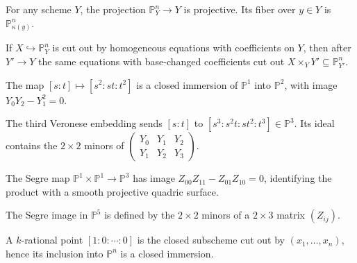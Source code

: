 \begin{example}\label{ex:vi38-08}
For any scheme \(Y\), the projection \(\mathbb P^n_Y\to Y\) is projective.  Its fiber over \(y\in Y\) is \(\mathbb P^n_{\kappa(y)}\).
\end{example}

\begin{example}\label{ex:vi38-09}
If \(X\hookrightarrow\mathbb P^n_Y\) is cut out by homogeneous equations with coefficients on \(Y\), then after \(Y'\to Y\) the same equations with base-changed coefficients cut out \(X\times_Y Y'\subseteq\mathbb P^n_{Y'}\).
\end{example}

\begin{example}\label{ex:vi38-10}
The map \([s:t]\mapsto[s^2:st:t^2]\) is a closed immersion of \(\mathbb P^1\) into \(\mathbb P^2\), with image \(Y_0Y_2-Y_1^2=0\).
\end{example}

\begin{example}\label{ex:vi38-11}
The third Veronese embedding sends \([s:t]\) to \([s^3:s^2t:st^2:t^3]\in\mathbb P^3\).  Its ideal contains the \(2\times2\) minors of \(\begin{pmatrix}Y_0&Y_1&Y_2\\Y_1&Y_2&Y_3\end{pmatrix}\).
\end{example}

\begin{example}\label{ex:vi38-12}
The Segre map \(\mathbb P^1\times\mathbb P^1\to\mathbb P^3\) has image \(Z_{00}Z_{11}-Z_{01}Z_{10}=0\), identifying the product with a smooth projective quadric surface.
\end{example}

\begin{example}\label{ex:vi38-13}
The Segre image in \(\mathbb P^5\) is defined by the \(2\times2\) minors of a \(2\times3\) matrix \((Z_{ij})\).
\end{example}

\begin{example}\label{ex:vi38-14}
A \(k\)-rational point \([1:0:\cdots:0]\) is the closed subscheme cut out by \((x_1,\ldots,x_n)\), hence its inclusion into \(\mathbb P^n\) is a closed immersion.
\end{example}

